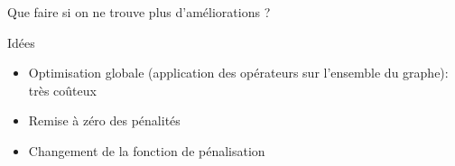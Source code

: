 \documentclass{beamer}
\begin{document}
\begin{frame}{Que faire si on ne trouve plus d'améliorations ?}
\begin{block}{Idées}

\begin{itemize}
\item Optimisation globale (application des opérateurs sur l'ensemble du graphe): très coûteux
\item Remise à zéro des pénalités
\item Changement de la fonction de pénalisation
\end{itemize}

\end{block}
\end{frame}
\end{document}
